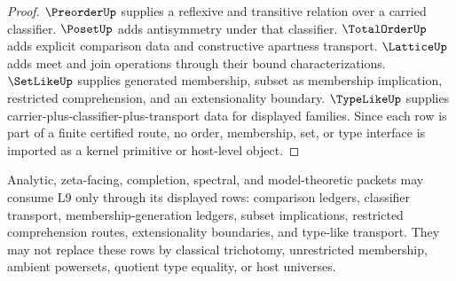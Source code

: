 \begin{proof}
$\PreorderUp$ supplies a reflexive and transitive relation over a carried
classifier.  $\PosetUp$ adds antisymmetry under that classifier.
$\TotalOrderUp$ adds explicit comparison data and constructive apartness
transport.  $\LatticeUp$ adds meet and join operations through their bound
characterizations.  $\SetLikeUp$ supplies generated membership, subset as
membership implication, restricted comprehension, and an extensionality
boundary.  $\TypeLikeUp$ supplies carrier-plus-classifier-plus-transport
data for displayed families.  Since each row is part of a finite certified
route, no order, membership, set, or type interface is imported as a kernel
primitive or host-level object.
\end{proof}

\begin{principle}
\label{prin:order-set-type-downstream-consumption}
Analytic, zeta-facing, completion, spectral, and model-theoretic packets may
consume L9 only through its displayed rows: comparison ledgers, classifier
transport, membership-generation ledgers, subset implications, restricted
comprehension routes, extensionality boundaries, and type-like transport.
They may not replace these rows by classical trichotomy, unrestricted
membership, ambient powersets, quotient type equality, or host universes.
\end{principle}
